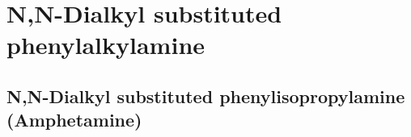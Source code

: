 \section{N,N-Dialkyl substituted phenylalkylamine}
\placeholderimagec

\subsection{N,N-Dialkyl substituted phenylisopropylamine (Amphetamine)}

\clearpage